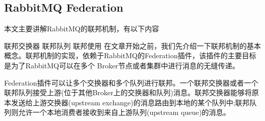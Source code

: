 \documentclass[../../../interview-questions.tex]{subfiles}
\begin{document}
\subsection{RabbitMQ Federation}

本文主要讲解RabbitMQ的联邦机制，有以下内容

联邦交换器
联邦队列
联邦使用 
在文章开始之前，我们先介绍一下联邦机制的基本概念。联邦机制的实现，依赖于RabbitMQ的Federation插件，该插件的主要目标是为了RabbitMQ可以在多个 Broker节点或者集群中进行消息的无缝传递。

Federation插件可以让多个交换器和多个队列进行联邦。一个联邦交换器或者一个联邦队列接受上游(位于其他Broker上的交换器和队列)消息。联邦交换器能够将原本发送给上游交换器(upstream exchange)的消息路由到本地的某个队列中;联邦队列则允许一个本地消费者接收到来自上游队列(upstream queue)的消息。
\end{document}
